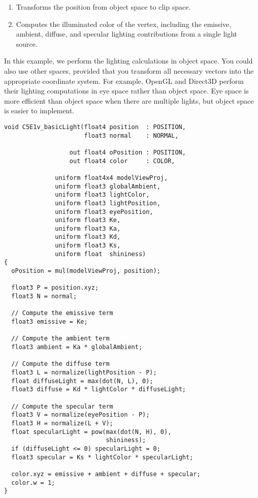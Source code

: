 \documentclass[../main.tex]{subfiles}
\begin{document}
\begin{enumerate}
\item Transforms the position from object space to clip space.
\item Computes the illuminated color of the vertex, including the emissive, ambient, diffuse, and specular lighting contributions from a single light source.
\end{enumerate}

In this example, we perform the lighting calculations in object space. You could also use other spaces, provided that you transform all necessary vectors into the appropriate coordinate system. For example, OpenGL and Direct3D perform their lighting computations in eye space rather than object space. Eye space is more efficient than object space when there are multiple lights, but object space is easier to implement.

\FloatBarrier
\begin{lstlisting}[caption=Example 5-1. The C5E1v_basicLight Vertex Program]
void C5E1v_basicLight(float4 position  : POSITION,
                      float3 normal    : NORMAL,

                  out float4 oPosition : POSITION,
                  out float4 color     : COLOR,

              uniform float4x4 modelViewProj,
              uniform float3 globalAmbient,
              uniform float3 lightColor,
              uniform float3 lightPosition,
              uniform float3 eyePosition,
              uniform float3 Ke,
              uniform float3 Ka,
              uniform float3 Kd,
              uniform float3 Ks,
              uniform float  shininess)
{
  oPosition = mul(modelViewProj, position);

  float3 P = position.xyz;
  float3 N = normal;

  // Compute the emissive term
  float3 emissive = Ke;

  // Compute the ambient term
  float3 ambient = Ka * globalAmbient;

  // Compute the diffuse term
  float3 L = normalize(lightPosition - P);
  float diffuseLight = max(dot(N, L), 0);
  float3 diffuse = Kd * lightColor * diffuseLight;

  // Compute the specular term
  float3 V = normalize(eyePosition - P);
  float3 H = normalize(L + V);
  float specularLight = pow(max(dot(N, H), 0),
                            shininess);
  if (diffuseLight <= 0) specularLight = 0;
  float3 specular = Ks * lightColor * specularLight;

  color.xyz = emissive + ambient + diffuse + specular;
  color.w = 1;
}
\end{lstlisting}
\FloatBarrier
\end{document}
